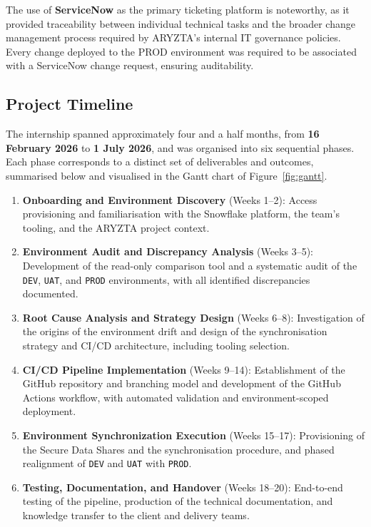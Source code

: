 The use of \textbf{ServiceNow} as the primary ticketing platform is noteworthy, as it provided traceability between individual technical tasks and the broader change management process required by ARYZTA's internal IT governance policies. Every change deployed to the PROD environment was required to be associated with a ServiceNow change request, ensuring auditability.

\subsection{Project Timeline}
\label{subsec:gantt}

The internship spanned approximately four and a half months, from \textbf{16 February 2026} to \textbf{1 July 2026}, and was organised into six sequential phases. Each phase corresponds to a distinct set of deliverables and outcomes, summarised below and visualised in the Gantt chart of Figure~\ref{fig:gantt}.

\begin{enumerate}
  \item \textbf{Onboarding and Environment Discovery} (Weeks 1--2): Access provisioning and familiarisation with the Snowflake platform, the team's tooling, and the ARYZTA project context.
  \item \textbf{Environment Audit and Discrepancy Analysis} (Weeks 3--5): Development of the read-only comparison tool and a systematic audit of the \texttt{DEV}, \texttt{UAT}, and \texttt{PROD} environments, with all identified discrepancies documented.
  \item \textbf{Root Cause Analysis and Strategy Design} (Weeks 6--8): Investigation of the origins of the environment drift and design of the synchronisation strategy and CI/CD architecture, including tooling selection.
  \item \textbf{CI/CD Pipeline Implementation} (Weeks 9--14): Establishment of the GitHub repository and branching model and development of the GitHub Actions workflow, with automated validation and environment-scoped deployment.
  \item \textbf{Environment Synchronization Execution} (Weeks 15--17): Provisioning of the Secure Data Shares and the synchronisation procedure, and phased realignment of \texttt{DEV} and \texttt{UAT} with \texttt{PROD}.
  \item \textbf{Testing, Documentation, and Handover} (Weeks 18--20): End-to-end testing of the pipeline, production of the technical documentation, and knowledge transfer to the client and delivery teams.
\end{enumerate}

